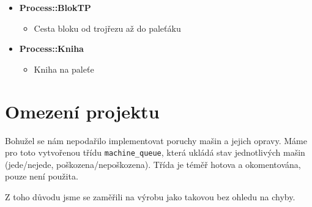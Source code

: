 \documentclass[a4paper, 11pt]{article}
\begin{document}
\begin{itemize}
	\item \textbf{Process::BlokTP}
	\begin{itemize}
		\item Cesta bloku od trojřezu až do paleťáku
	\end{itemize}
	
	\item \textbf{Process::Kniha }
	\begin{itemize}
		\item Kniha na paleťe
	\end{itemize}
	
\end{itemize}

\section{Omezení projektu}

Bohužel se nám nepodařilo implementovat poruchy mašin a jejich opravy. Máme pro toto vytvořenou třídu \texttt{machine\_queue}, která ukládá stav jednotlivých mašin (jede/nejede, poškozena/nepoškozena). Třída je téměř hotova a okomentována, pouze není použita.

Z toho důvodu jsme se zaměřili na výrobu jako takovou bez ohledu na chyby.
\end{document}
